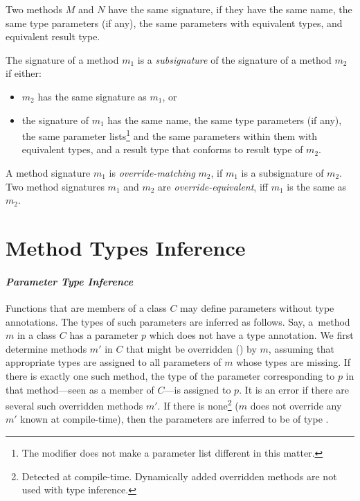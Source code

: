 Two methods $M$ and $N$ have the same signature, if they have the same name, the same type parameters (if any), the same parameters with equivalent types, and equivalent result type. 

The signature of a method $m_1$ is a {\em subsignature} of the signature of a method $m_2$ if either:
\begin{itemize}
\item $m_2$ has the same signature as $m_1$, or
\item the signature of $m_1$ has the same name, the same type parameters (if any), the same parameter lists\footnote{The  modifier does not make a parameter list different in this matter.} and the same parameters within them with equivalent types, and a result type that conforms to result type of $m_2$. 
\end{itemize}

A method signature $m_1$ is {\em override-matching} $m_2$, if $m_1$ is a subsignature of $m_2$. Two method signatures $m_1$ and $m_2$ are {\em override-equivalent}, iff $m_1$ is the same as $m_2$. 






\section{Method Types Inference}
\label{sec:method-types-inference}

\paragraph{\em Parameter Type Inference}
Functions that are members of a class $C$ may define parameters without type annotations. The types of such parameters are inferred as follows. Say, a~method $m$ in a class $C$ has a parameter $p$ which does not have a type annotation. We first determine methods $m'$ in $C$ that might be overridden () by $m$, assuming that appropriate types are assigned to all parameters of $m$ whose types are missing. If there is exactly one such method, the type of the parameter corresponding to $p$ in that method---seen as a member of $C$---is assigned to $p$. It is an error if there are several such overridden methods $m'$. If there is none\footnote{Detected at compile-time. Dynamically added overridden methods are not used with type inference.} ($m$ does not override any $m'$ known at compile-time), then the parameters are inferred to be of type .

